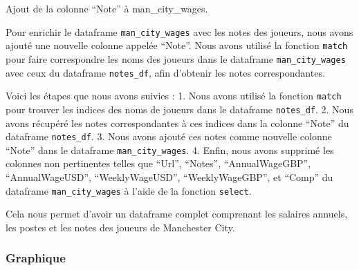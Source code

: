 \documentclass[
]{article}
\newenvironment{Shaded}{\begin{snugshade}}{\end{snugshade}}
\newcommand{\CommentTok}[1]{\textcolor[rgb]{0.56,0.35,0.01}{\textit{#1}}}
\newcommand{\FunctionTok}[1]{\textcolor[rgb]{0.13,0.29,0.53}{\textbf{#1}}}
\newcommand{\NormalTok}[1]{#1}
\newcommand{\OtherTok}[1]{\textcolor[rgb]{0.56,0.35,0.01}{#1}}
\newcommand{\SpecialCharTok}[1]{\textcolor[rgb]{0.81,0.36,0.00}{\textbf{#1}}}
\begin{document}
Ajout de la colonne ``Note'' à man\_city\_wages.

Pour enrichir le dataframe \texttt{man\_city\_wages} avec les notes des
joueurs, nous avons ajouté une nouvelle colonne appelée ``Note''. Nous
avons utilisé la fonction \texttt{match} pour faire correspondre les
noms des joueurs dans le dataframe \texttt{man\_city\_wages} avec ceux
du dataframe \texttt{notes\_df}, afin d'obtenir les notes
correspondantes.

Voici les étapes que nous avons suivies : 1. Nous avons utilisé la
fonction \texttt{match} pour trouver les indices des noms de joueurs
dans le dataframe \texttt{notes\_df}. 2. Nous avons récupéré les notes
correspondantes à ces indices dans la colonne ``Note'' du dataframe
\texttt{notes\_df}. 3. Nous avons ajouté ces notes comme nouvelle
colonne ``Note'' dans le dataframe \texttt{man\_city\_wages}. 4. Enfin,
nous avons supprimé les colonnes non pertinentes telles que ``Url'',
``Notes'', ``AnnualWageGBP'', ``AnnualWageUSD'', ``WeeklyWageUSD'',
``WeeklyWageGBP'', et ``Comp'' du dataframe \texttt{man\_city\_wages} à
l'aide de la fonction \texttt{select}.

\begin{Shaded}
\end{Shaded}

Cela nous permet d'avoir un dataframe complet comprenant les salaires
annuels, les postes et les notes des joueurs de Manchester City.

\subsubsection{Graphique}\label{graphique}
\end{document}

